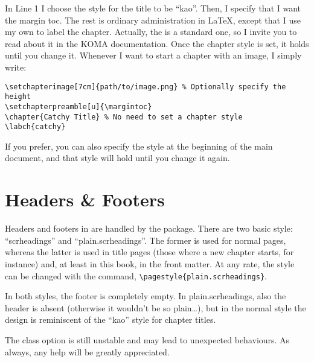 In Line 1 I choose the style for the title to be \enquote{kao}. Then, I 
specify that I want the margin toc. The rest is ordinary administration 
in \LaTeX, except that I use my own  to label the 
chapter. Actually, the  is a standard 
\KOMAScript\xspace one, so I invite you to read about it in the KOMA
documentation. Once the chapter style is set, it holds until you change 
it. Whenever I want to start a chapter with an image, 
I simply write:

\begin{lstlisting}
\setchapterimage[7cm]{path/to/image.png} % Optionally specify the height
\setchapterpreamble[u]{\margintoc}
\chapter{Catchy Title} % No need to set a chapter style
\labch{catchy}
\end{lstlisting}

If you prefer, you can also specify the style at the beginning of the 
main document, and that style will hold until you change it again.

\section{Headers \& Footers}

Headers and footers in \KOMAScript\xspace are handled by the 
 package. There are two basic style: 
\enquote{scrheadings} and \enquote{plain.scrheadings}. The former is 
used for normal pages, whereas the latter is used in title pages (those 
where a new chapter starts, for instance) and, at least in this book, in 
the front matter. At any rate, the style can be changed with the 
 command, \eg 
\lstinline|\pagestyle{plain.scrheadings}|.

In both styles, the footer is completely empty. In plain.scrheadings,
also the header is absent (otherwise it wouldn't be so plain\ldots), but 
in the normal style the design is reminiscent of the \enquote{kao} style
for chapter titles.

\begin{kaobox}[frametitle=To Do]
The  class option is still unstable and may lead to 
unexpected behaviours. As always, any help will be greatly appreciated.
\end{kaobox}

